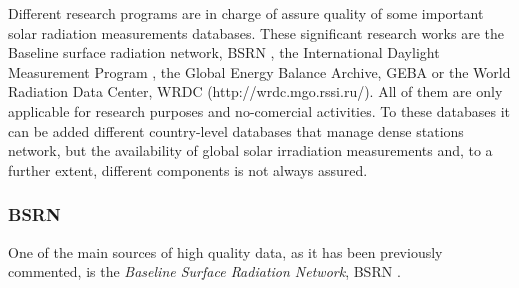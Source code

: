 Different research programs are in charge of assure quality of some important solar radiation measurements databases. These significant research works are the Baseline surface radiation network, BSRN \cite*{Konig-Langlo2013}, the International Daylight Measurement Program \cite*{dumortier1999status}, the Global Energy Balance Archive, GEBA \cite*{Gilgen1998} or the World Radiation Data Center, WRDC (http://wrdc.mgo.rssi.ru/). All of them are only applicable for research purposes and no-comercial activities. To these databases it can be added different country-level databases that manage dense stations network, but the availability of global solar irradiation measurements and, to a further extent, different components is not always assured.


\subsubsection{BSRN}

One of the main sources of high quality data, as it has been previously commented, is the \textit{Baseline Surface Radiation Network}, BSRN \cite*{Konig-Langlo2013}. %


